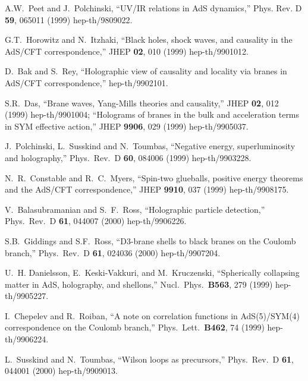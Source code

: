 \documentclass[a4paper,12pt]{article}
\begin{document}
\begin{thebibliography}{10}
A.W.~Peet and J.~Polchinski, 
``UV/IR relations in AdS dynamics,''
Phys. Rev. D {\bf 59}, 065011 (1999) 
hep-th/9809022. 
 
G.T.~Horowitz and N.~Itzhaki, 
``Black holes, shock waves, and causality in the AdS/CFT correspondence,'' 
JHEP {\bf 02}, 010 (1999) 
hep-th/9901012. 
 
D.~Bak and S.~Rey, 
``Holographic view of causality and locality via branes in AdS/CFT 
correspondence,'' 
hep-th/9902101. 
 
S.R.~Das, 
``Brane waves, Yang-Mills theories and causality,'' 
JHEP {\bf 02}, 012 (1999) 
hep-th/9901004;
``Holograms of branes in the bulk and acceleration terms in SYM effective 
action,'' JHEP {\bf 9906}, 029 (1999)
hep-th/9905037. 
 
J.~Polchinski, L.~Susskind and N.~Toumbas,
``Negative energy, superluminosity and holography,''
Phys.\ Rev.\  D {\bf 60}, 084006 (1999)
hep-th/9903228.

N.~R.~Constable and R.~C.~Myers,
``Spin-two glueballs, positive energy 
theorems and the AdS/CFT  correspondence,''
JHEP {\bf 9910}, 037 (1999)
hep-th/9908175.

V.~Balasubramanian and S.~F.~Ross,
``Holographic particle detection,''
Phys.\ Rev.\  D {\bf 61}, 044007 (2000)
hep-th/9906226.

S.B.~Giddings and S.F.~Ross,
``D3-brane shells to black branes on the Coulomb branch,''
Phys.\ Rev.\  D {\bf 61}, 024036 (2000)
hep-th/9907204.

U.~H. Danielsson, E.~Keski-Vakkuri, and M.~Kruczenski, 
``Spherically
collapsing  matter in AdS, holography, and shellons,''
Nucl.\ Phys.\  {\bf B563}, 279 (1999)
hep-th/9905227.

I.~Chepelev and R.~Roiban, 
``A note on correlation functions in AdS(5)/SYM(4)
  correspondence on the Coulomb branch,''
Phys.\ Lett.\  {\bf B462}, 74 (1999)
hep-th/9906224.

L.~Susskind and N.~Toumbas,
``Wilson loops as precursors,''
Phys.\ Rev.\  D {\bf 61}, 044001 (2000)
hep-th/9909013.


\end{thebibliography}
\end{document}
